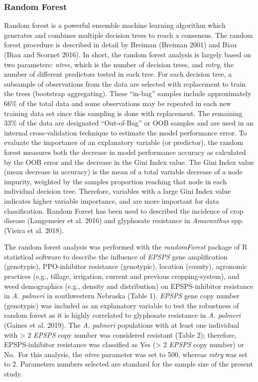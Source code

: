 \documentclass[
  12pt,
  a4paper]{article}
\begin{document}
\hypertarget{random-forest}{%
\subsubsection{Random Forest}\label{random-forest}}

Random forest is a powerful ensemble machine learning algorithm which
generates and combines multiple decision trees to reach a consensus. The
random forest procedure is described in detail by Breiman (Breiman 2001)
and Biau (Biau and Scornet 2016). In short, the random forest analysis
is largely based on two parameters: \emph{ntree}, which is the number of
decision trees, and \emph{mtry}, the number of different predictors
tested in each tree. For each decision tree, a subsample of observations
from the data are selected with replacement to train the trees
(bootstrap aggregating). These ``in-bag'' samples include approximately
66\% of the total data and some observations may be repeated in each new
training data set since this sampling is done with replacement. The
remaining 33\% of the data are designated ``Out-of-Bag'' or OOB samples
and are used in an internal cross-validation technique to estimate the
model performance error. To evaluate the importance of an explanatory
variable (or predictor), the random forest measures both the decrease in
model performance accuracy as calculated by the OOB error and the
decrease in the Gini Index value. The Gini Index value (mean decrease in
accuracy) is the mean of a total variable decrease of a node impurity,
weighted by the samples proportion reaching that node in each individual
decision tree. Therefore, variables with a large Gini Index value
indicates higher variable importance, and are more important for data
classification. Random Forest has been used to described the incidence
of crop disease (Langemeier et al. 2016) and glyphosate resistance in
\emph{Amaranthus} spp. (Vieira et al. 2018).

The random forest analysis was performed with the \emph{randomForest}
package of R statistical software to describe the influence of
\emph{EPSPS} gene amplification (genotypic), PPO-inhibitor resistance
(genotypic), location (county), agronomic practices (e.g., tillage,
irrigation, current and previous cropping-system), and weed demographics
(e.g., density and distribution) on EPSPS-inhibitor resistance in
\emph{A. palmeri} in southwestern Nebraska (Table 1). \emph{EPSPS} gene
copy number (genotypic) was included as an explanatory variable to test
the robustness of random forest as it is highly correlated to glyphosate
resistance in \emph{A. palmeri} (Gaines et al. 2019). The \emph{A.
palmeri} populations with at least one individual with \textgreater{} 2
\emph{EPSPS} copy number was considered resistant (Table 2); therefore,
EPSPS-inhibitor resistance was classified as Yes (\textgreater{} 2
\emph{EPSPS} copy number) or No.~For this analysis, the \emph{ntree}
parameter was set to 500, whereas \emph{mtry} was set to 2. Parameters
numbers selected are standard for the sample size of the present study.
\end{document}
